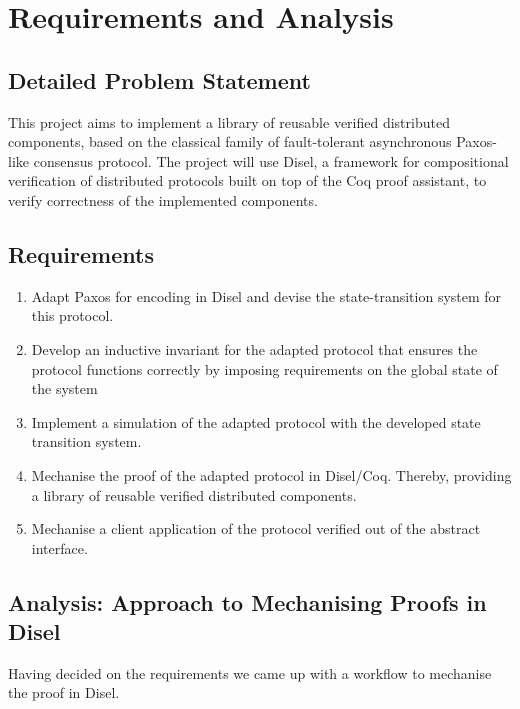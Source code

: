 \chapter{Requirements and Analysis}

\section{Detailed Problem Statement}
This project aims to implement a library of reusable verified distributed components,
based on the classical family of fault-tolerant asynchronous Paxos-like consensus protocol.
The project will use Disel, a framework for compositional verification of distributed
protocols built on top of the Coq proof assistant, to verify correctness of the
implemented components.

\section{Requirements}
\begin{enumerate}
  \item Adapt Paxos for encoding in Disel and devise the state-transition system for this protocol.
  \item Develop an inductive invariant for the adapted protocol that
    ensures the protocol functions correctly by imposing requirements on the global state of the system
  \item Implement a simulation of the adapted protocol with the developed state transition system.
  \item Mechanise the proof of the adapted protocol in Disel/Coq.
    Thereby, providing a library of reusable verified distributed components.
  \item Mechanise a client application of the protocol verified out of the abstract interface.
\end{enumerate}

\vspace{-5mm}
\section{Analysis: Approach to Mechanising Proofs in Disel}
Having decided on the requirements we came up with a workflow to
mechanise the proof in Disel.

